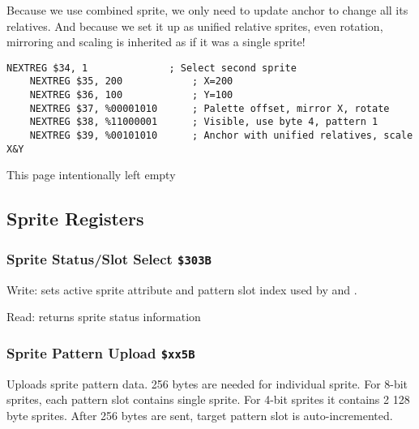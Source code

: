 \documentclass[12pt,twoside,openright,a4paper]{book}
\newcommand{\intentiallyempty}{
	\mbox{}
	\vfill
	\begin{center}
	This page intentionally left empty
	\end{center}
	\vfill
	\mbox{}
}
\begin{document}
Because we use combined sprite, we only need to update anchor to change all its relatives. And because we set it up as unified relative sprites, even rotation, mirroring and scaling is inherited as if it was a single sprite!

\begin{Verbatim}[gobble=1]
	NEXTREG $34, 1              ; Select second sprite
	NEXTREG $35, 200            ; X=200
	NEXTREG $36, 100            ; Y=100
	NEXTREG $37, %00001010      ; Palette offset, mirror X, rotate
	NEXTREG $38, %11000001      ; Visible, use byte 4, pattern 1
	NEXTREG $39, %00101010      ; Anchor with unified relatives, scale X&Y 
\end{Verbatim}


\pagebreak
\intentiallyempty
\pagebreak

\subsection{Sprite Registers}

\subsubsection{Sprite Status/Slot Select {\tt \$303B}}

Write: sets active sprite attribute and pattern slot index used by  and .

\begin{NextPort}
\end{NextPort}

Read: returns sprite status information

\begin{NextPort}
\end{NextPort}


\subsubsection{Sprite Pattern Upload {\tt \$xx5B}}

Uploads sprite pattern data. 256 bytes are needed for individual sprite. For 8-bit sprites, each pattern slot contains single sprite. For 4-bit sprites it contains 2 128 byte sprites. After 256 bytes are sent, target pattern slot is auto-incremented.
\end{document}
